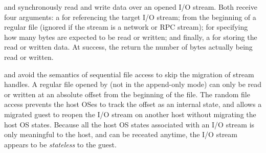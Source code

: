  and  synchronously
read and write data over an opened I/O stream.
Both \hostapis{} receive four arguments: a  for referencing the target I/O stream;
 from the beginning of a regular file
(ignored if the stream is a network or RPC stream);
 for specifying how many bytes are expected to be read or written;
and finally, a  for storing the read or written data.
At success, the \hostapis{} return the number of bytes
actually being read or written.


     







 and  avoid the semantics of sequential file access
to skip the migration of stream handles.
A regular file opened by  (not in the append-only mode)
can only be read or written at an absolute offset
from the beginning of the file.
The random file access prevents the host OSes to track the offset
as an internal state,
and allows a migrated guest to reopen the I/O stream on another host
without migrating the host OS states.
Because all the host OS states associated with an I/O stream is only meaningful to the host,
and can be receated anytime,
the I/O stream appears to be {\em stateless} to the guest.






